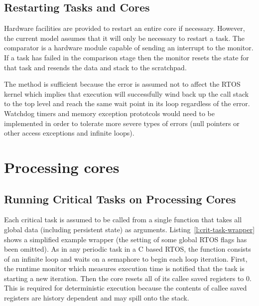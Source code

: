 \subsection{Restarting Tasks and Cores}

	Hardware facilities are provided to restart an entire core if necessary. 
	However, the current model assumes that it will only be necessary to restart a task.
	The comparator is a hardware module capable of sending an interrupt to the monitor. 
	If a task has failed in the comparison stage then the monitor resets the state for that task and resends the data and stack to the scratchpad.

	The method is sufficient because the error is assumed not to affect the RTOS kernel which implies that execution will successfully wind back up the call stack to the top level and reach the same wait point in its loop regardless of the error.
	Watchdog timers and memory exception prototcols would need to be implemented in order to tolerate more severe types of errors (null pointers or other access exceptions and infinite loops).



\section{Processing cores}
\label{s:proc-cores}
\subsection{Running Critical Tasks on Processing Cores}

	Each critical task is assumed to be called from a single function that takes all global data (including persistent state) as arguments. 
	Listing~\ref{l:crit-task-wrapper} shows a simplified example wrapper (the setting of some global RTOS flags has been omitted). 
	As in any periodic task in a C based RTOS, the function consists of an infinite loop and waits on a semaphore to begin each loop iteration. 
	First, the runtime monitor which measures execution time is notified that the task is starting a new iteration. 
	Then the core resets all of its callee saved registers to 0. 
	This is required for deterministic execution because the contents of callee saved registers are history dependent and may spill onto the stack. 

